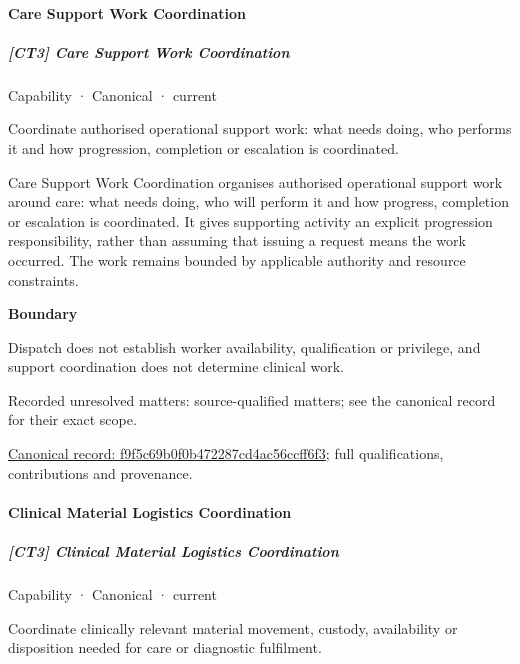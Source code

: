 \paragraph{Care Support Work Coordination}

\subparagraph{[CT3] Care Support Work Coordination}

\label{element:f9f5c69b0f0b472287cd4ac56ccff6f3}
{\small Capability · Canonical · current}\par

Coordinate authorised operational support work: what needs doing, who performs it and how progression, completion or escalation is coordinated.



Care Support Work Coordination organises authorised operational support work around care: what needs doing, who will perform it and how progress, completion or escalation is coordinated. It gives supporting activity an explicit progression responsibility, rather than assuming that issuing a request means the work occurred. The work remains bounded by applicable authority and resource constraints.



\textbf{Boundary}



Dispatch does not establish worker availability, qualification or privilege, and support coordination does not determine clinical work.


{\small Recorded unresolved matters: source-qualified matters; see the canonical record for their exact scope.}\par
{\footnotesize \href{../../../../continuum/strategy/capability/f9f5c69b0f0b472287cd4ac56ccff6f3.md}{Canonical record: f9f5c69b0f0b472287cd4ac56ccff6f3}; full qualifications, contributions and provenance.}\par
\paragraph{Clinical Material Logistics Coordination}

\subparagraph{[CT3] Clinical Material Logistics Coordination}

\label{element:4b66444de58a48a9a9433568bf3a60d3}
{\small Capability · Canonical · current}\par

Coordinate clinically relevant material movement, custody, availability or disposition needed for care or diagnostic fulfilment.



